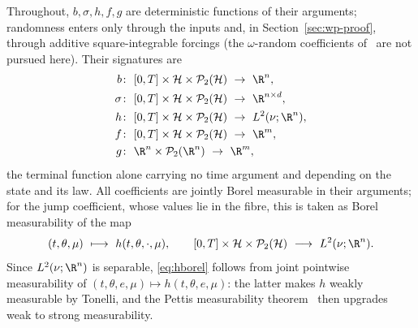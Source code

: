 Throughout, $b,\sigma,h,f,g$ are deterministic functions of their arguments; randomness
enters only through the inputs and, in Section~\ref{sec:wp-proof}, through additive
square-integrable forcings (the $\omega$-random coefficients of~\cite{ChenNie,LiMin} are
not pursued here). Their signatures are
\[
\begin{aligned}
b&\colon\ [0,T]\times\mathcal H\times\mathcal P_2(\mathcal H)\ \to\ \R^n,\\
\sigma&\colon\ [0,T]\times\mathcal H\times\mathcal P_2(\mathcal H)\ \to\ \R^{n\times d},\\
h&\colon\ [0,T]\times\mathcal H\times\mathcal P_2(\mathcal H)\ \to\ L^2(\nu;\R^n),\\
f&\colon\ [0,T]\times\mathcal H\times\mathcal P_2(\mathcal H)\ \to\ \R^m,\\
g&\colon\ \R^n\times\mathcal P_2(\R^n)\ \to\ \R^m,
\end{aligned}
\]
the terminal function alone carrying no time argument and depending on the state and its
law. All coefficients are jointly Borel measurable in their arguments; for the jump
coefficient, whose values lie in the fibre, this is taken as Borel measurability of the map
\begin{equation}\label{eq:hborel}
(t,\theta,\mu)\ \longmapsto\ h(t,\theta,\cdot,\mu),
\qquad
[0,T]\times\mathcal H\times\mathcal P_2(\mathcal H)\ \longrightarrow\ L^2(\nu;\R^n).
\end{equation}
Since $L^2(\nu;\R^n)$ is separable, \eqref{eq:hborel} follows from joint pointwise
measurability of $(t,\theta,e,\mu)\mapsto h(t,\theta,e,\mu)$: the latter makes $h$ weakly
measurable by Tonelli, and the Pettis measurability
theorem~\cite[Theorem~1.1.6]{HNVW} then upgrades weak to strong measurability.

